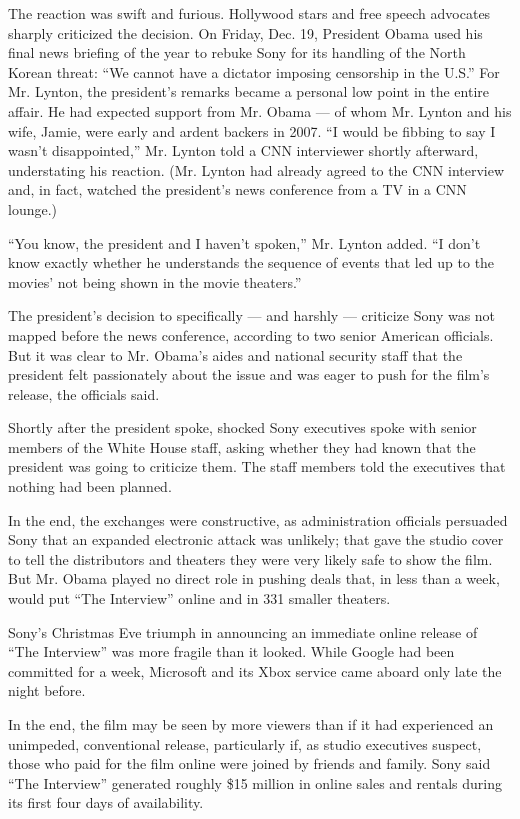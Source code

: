 The reaction was swift and furious. Hollywood stars and free speech
advocates sharply criticized the decision. On Friday, Dec. 19, President
Obama used his final news briefing of the year to rebuke Sony for its
handling of the North Korean threat: ``We cannot have a dictator
imposing censorship in the U.S.'' For Mr. Lynton, the president's
remarks became a personal low point in the entire affair. He had
expected support from Mr. Obama --- of whom Mr. Lynton and his wife,
Jamie, were early and ardent backers in 2007. ``I would be fibbing to
say I wasn't disappointed,'' Mr. Lynton told a CNN interviewer shortly
afterward, understating his reaction. (Mr. Lynton had already agreed to
the CNN interview and, in fact, watched the president's news conference
from a TV in a CNN lounge.)

``You know, the president and I haven't spoken,'' Mr. Lynton added. ``I
don't know exactly whether he understands the sequence of events that
led up to the movies' not being shown in the movie theaters.''

The president's decision to specifically --- and harshly --- criticize
Sony was not mapped before the news conference, according to two senior
American officials. But it was clear to Mr. Obama's aides and national
security staff that the president felt passionately about the issue and
was eager to push for the film's release, the officials said.

Shortly after the president spoke, shocked Sony executives spoke with
senior members of the White House staff, asking whether they had known
that the president was going to criticize them. The staff members told
the executives that nothing had been planned.

In the end, the exchanges were constructive, as administration officials
persuaded Sony that an expanded electronic attack was unlikely; that
gave the studio cover to tell the distributors and theaters they were
very likely safe to show the film. But Mr. Obama played no direct role
in pushing deals that, in less than a week, would put ``The Interview''
online and in 331 smaller theaters.

Sony's Christmas Eve triumph in announcing an immediate online release
of ``The Interview'' was more fragile than it looked. While Google had
been committed for a week, Microsoft and its Xbox service came aboard
only late the night before.

In the end, the film may be seen by more viewers than if it had
experienced an unimpeded, conventional release, particularly if, as
studio executives suspect, those who paid for the film online were
joined by friends and family. Sony said ``The Interview'' generated
roughly \$15 million in online sales and rentals during its first four
days of availability.


